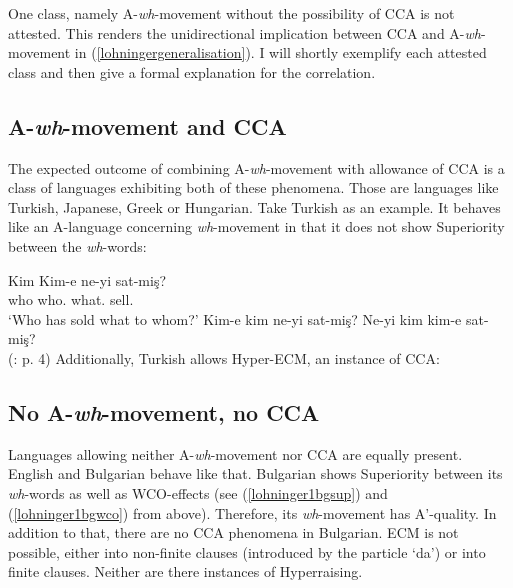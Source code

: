 \documentclass[output=paper,colorlinks,citecolor=brown]{langscibook}
\begin{document}
One class, namely A-\textit{wh}-movement without the possibility of CCA is not attested. This renders the unidirectional implication between CCA and A-\textit{wh}-movement in (\ref{lohningergeneralisation}). I will shortly exemplify each attested class and then give a formal explanation for the correlation. 

\subsection{A-\textit{wh}-movement and CCA}
The expected outcome of combining A-\textit{wh}-movement with allowance of CCA is a class of languages exhibiting both of these phenomena. Those are languages like Turkish, Japanese, Greek or Hungarian. Take Turkish as an example. It behaves like an A-language concerning \textit{wh}-movement in that it does not show Superiority between the \textit{wh}-words:

\ea
\ea
\gll Kim Kim-e ne-yi sat-mi\c{s}?\\
who who. what. sell.\\
\glt `Who has sold what to whom?'
\ex Kim-e kim ne-yi sat-mi\c{s}?
\ex Ne-yi kim kim-e sat-mi\c{s}?\\
(\citealp{ozsoy1996dependencies}: p. 4)
\z
\z
Additionally, Turkish allows Hyper-ECM, an instance of CCA:

\z

\subsection{No A-\textit{wh}-movement, no CCA}
Languages allowing neither A-\textit{wh}-movement nor CCA are equally present. English and Bulgarian behave like that. Bulgarian shows Superiority between its \textit{wh}-words as well as WCO-effects (see (\ref{lohninger1bgsup}) and (\ref{lohninger1bgwco}) from above). Therefore, its \textit{wh}-movement has A'-quality. In addition to that, there are no CCA phenomena in Bulgarian. ECM is not possible, either into non-finite clauses (introduced by the particle `da') or into finite clauses. Neither are there instances of Hyperraising.
\end{document}
